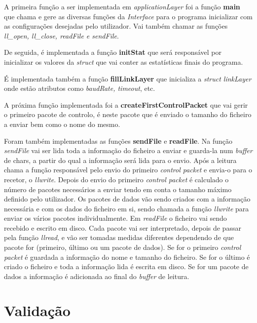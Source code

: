 \documentclass[11pt]{article}
\begin{document}
A primeira função a ser implementada em \textit{applicationLayer} foi a função \textbf{main} que chama e gere as diversas funções da \textit{Interface} para o programa inicializar com as configurações desejadas pelo utilizador. Vai também chamar as funções \textit{ll\_open, ll\_close, readFile e sendFile}. 
\par De seguida, é implementada a função \textbf{initStat} que será responsável por inicializar os valores da \textit{struct} que vai conter as estatísticas finais do programa.
\par É implementada também a função \textbf{fillLinkLayer} que inicializa a \textit{struct linkLayer} onde estão atributos como \textit{baudRate, timeout}, etc.
\par A próxima função implementada foi a \textbf{createFirstControlPacket} que vai gerir o primeiro pacote de controlo, é neste pacote que é enviado o tamanho do ficheiro a enviar bem como o nome do mesmo.
\par Foram também implementadas as funções \textbf{sendFile} e \textbf{readFile}. Na função \textit{sendFile} vai ser lida toda a informação do ficheiro a enviar e guarda-la num \textit{buffer} de chars, a partir do qual a informação será lida para o envio. Após a leitura chama a função responsável pelo envio do primeiro \textit{control packet} e envia-o para o recetor, o \textit{llwrite}. Depois do envio do primeiro \textit{control packet} é calculado o número de pacotes necessários a enviar tendo em conta o tamanho máximo definido pelo utilizador. Os pacotes de dados vão sendo criados com a informação necessária e com os dados do ficheiro em si, sendo chamada a função \textit{llwrite} para enviar os vários pacotes individualmente. Em \textit{readFile} o ficheiro vai sendo recebido e escrito em disco. Cada pacote vai ser interpretado, depois de passar pela função \textit{llread}, e vão ser tomadas medidas diferentes dependendo de que pacote for (primeiro, último ou um pacote de dados). Se for o primeiro \textit{control packet} é guardada a informação do nome e tamanho do ficheiro. Se for o último é criado o ficheiro e toda a informação lida é escrita em disco. Se for um pacote de dados a informação é adicionada ao final do \textit{buffer} de leitura.



\newpage
\section{Validação}
\end{document}
